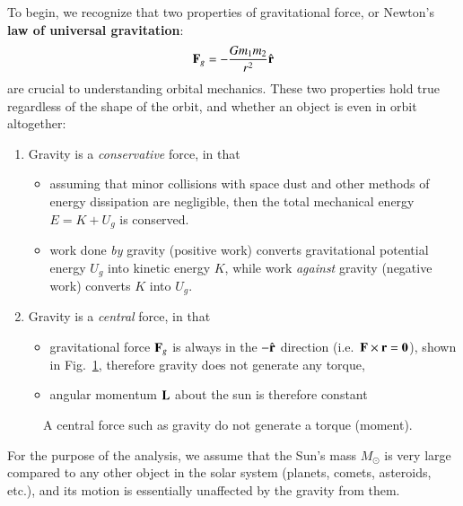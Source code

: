 \documentclass{../../../oss-handout}
\newcommand{\mb}[1]{\ensuremath\mathbf{#1}}
\begin{document}
To begin, we recognize that two properties of gravitational force, or Newton's
\textbf{law of universal gravitation}:
\begin{equation}
  \mb{F}_g=-\frac{Gm_1m_2}{r^2}\hat{\mb{r}}
\end{equation}
are crucial to
understanding orbital mechanics. These two properties hold true regardless
of the shape of the orbit, and whether an object is even in orbit altogether:
\begin{enumerate}[leftmargin=18pt,topsep=0pt]
\item Gravity is a \emph{conservative} force, in that
  \begin{itemize}[leftmargin=15pt,noitemsep,topsep=0pt]
  \item assuming that minor collisions with space dust and other methods of
    energy dissipation are negligible, then the total mechanical energy
    $E=K+U_g$ is conserved.
  \item work done \emph{by} gravity (positive work) converts gravitational
    potential energy $U_g$ into kinetic energy $K$, while work \emph{against}
    gravity (negative work) converts $K$ into $U_g$.
  \end{itemize}
\item Gravity is a \emph{central} force, in that
  \begin{itemize}[leftmargin=15pt,noitemsep,topsep=0pt]
  \item gravitational force $\mb{F}_g$ is always in the $-\hat{\mb{r}}$
    direction (i.e.\ $\mb{F}\times\mb{r}=\mb{0}$), shown in
    Fig.~\ref{central-force}, therefore gravity does not generate any torque,
  \item angular momentum $\mb{L}$ about the sun is therefore constant
  \end{itemize}
\end{enumerate}
\begin{figure}[!ht]
  \centering
  \caption{A central force such as gravity do not generate a torque (moment).}
  \label{central-force}
\end{figure}
For the purpose of the analysis, we assume that the Sun's mass $M_\odot$
is very large compared to any other object in the solar system (planets,
comets, asteroids, etc.), and its motion is essentially unaffected by the
gravity from them.
\end{document}
